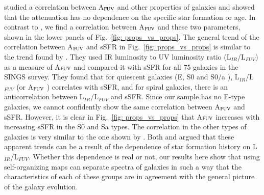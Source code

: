          studied a correlation between A$_{\rm {FUV}}$ and other properties of galaxies and showed that the attenuation has no dependence on the specific star formation or age.
        In contrast to , we find a correlation between A$_{\rm {FUV}}$ and these two parameters, shown in the lower panels of Fig.~\ref{fig: props_vs_props}.
        The general trend of the correlation between A$_{\rm {FUV}}$ and sSFR in Fig.~\ref{fig: props_vs_props} is similar to the trend found by \cite{Dale07}.
        They used IR luminosity to UV luminosity ratio (L$_{IR}$/L$_{FUV}$) as a measure of A$_{\rm {FUV}}$ and compared it with sSFR for all 75 galaxies in the SINGS survey.
        They found that for quiescent galaxies (E, S0 and S0/a ), L$_{IR}$/L$_{FUV}$ (or A$_{\rm {FUV}}$ ) correlates with sSFR, and for spiral galaxies, there is an anticorrelation between L$_{IR}$/L$_{FUV}$ and sSFR.
       Since our sample has no E-type galaxies, we cannot confidently show the same correlation between A$_{\rm {FUV}}$ and sSFR. 
        However, it is clear in Fig.~\ref{fig: props_vs_props} that A$_{\rm {FUV}}$ increases with increasing sSFR in the S0 and Sa types.
        The correlation in the other types of galaxies is very similar to the one shown by \cite{Dale07}.
        Both \cite{Dale07} and  argued that these apparent trends can be a result of the dependence of star formation history on L$_{IR}$/L$_{FUV}$.
        Whether this dependence is real or not, our results here show that using self-organizing maps can separate spectra of galaxies in such a way that the characteristics of each of these groups are in agreement with the general picture of the galaxy evolution.
      
